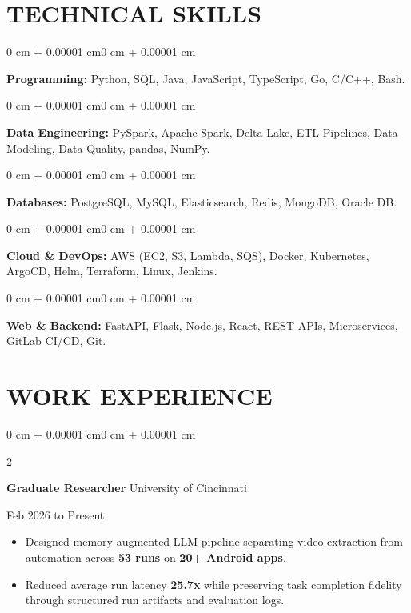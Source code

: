 \documentclass[10pt, letterpaper]{article}
\newenvironment{highlights}{
    \begin{itemize}[
        topsep=0.10 cm,
        parsep=0.06 cm,
        partopsep=0pt,
        itemsep=0.06 cm,
        leftmargin=12pt
    ]
}{
    \end{itemize}
}
\newenvironment{onecolentry}{
    \begin{adjustwidth}{0 cm + 0.00001 cm}{0 cm + 0.00001 cm}
}{
    \end{adjustwidth}
}
\newenvironment{twocolentry}[2][]{
    \onecolentry
    \def\secondColumn{#2}
    \setcolumnwidth{\fill, 4.5 cm}
    \begin{paracol}{2}
}{
    \switchcolumn \raggedleft \secondColumn
    \end{paracol}
    \endonecolentry
}
\begin{document}
\section{TECHNICAL SKILLS}
\begin{onecolentry}
\textbf{Programming:} Python, SQL, Java, JavaScript, TypeScript, Go, C/C++, Bash.
\end{onecolentry}
\vspace{0.06 cm}
\begin{onecolentry}
\textbf{Data Engineering:} PySpark, Apache Spark, Delta Lake, ETL Pipelines, Data Modeling, Data Quality, pandas, NumPy.
\end{onecolentry}
\vspace{0.06 cm}
\begin{onecolentry}
\textbf{Databases:} PostgreSQL, MySQL, Elasticsearch, Redis, MongoDB, Oracle DB.
\end{onecolentry}
\vspace{0.06 cm}
\begin{onecolentry}
\textbf{Cloud \& DevOps:} AWS (EC2, S3, Lambda, SQS), Docker, Kubernetes, ArgoCD, Helm, Terraform, Linux, Jenkins.
\end{onecolentry}
\vspace{0.06 cm}
\begin{onecolentry}
\textbf{Web \& Backend:} FastAPI, Flask, Node.js, React, REST APIs, Microservices, GitLab CI/CD, Git.
\end{onecolentry}

\section{WORK EXPERIENCE}
\begin{twocolentry}{Feb 2026 to Present}
\textbf{Graduate Researcher} \textbar{} University of Cincinnati
\end{twocolentry}
\begin{highlights}
  \item Designed memory augmented LLM pipeline separating video extraction from automation across \textbf{53 runs} on \textbf{20+ Android apps}.
  \item Reduced average run latency \textbf{25.7x} while preserving task completion fidelity through structured run artifacts and evaluation logs.
\end{highlights}

\vspace{0.15 cm}
\end{document}
